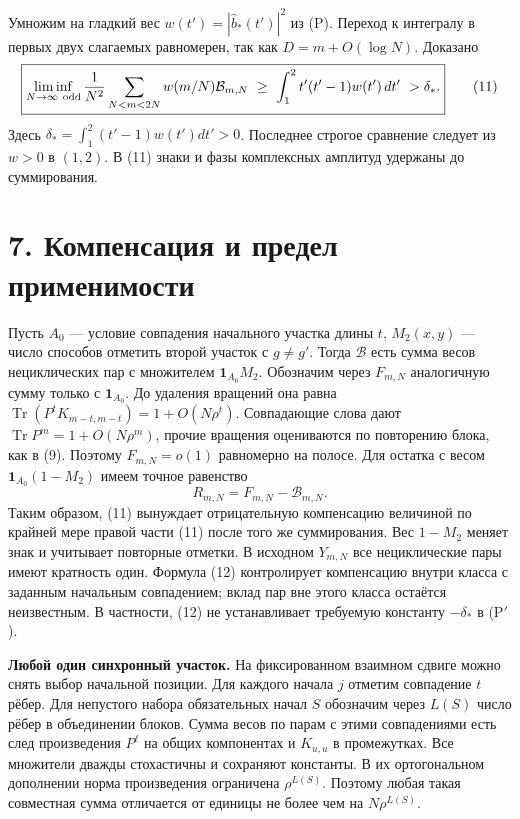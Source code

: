 \documentclass[11pt,a4paper]{article}
\newcommand{\Tr}{\operatorname{Tr}}
\newcommand{\sect}[1]{\section*{\sffamily\color{ink}#1}}
\newcommand{\subt}[1]{\par\medskip\noindent\textbf{#1.}\quad}
\begin{document}
Умножим на гладкий вес $w(t')=|\widehat b_*(t')|^2$ из (P). Переход к интегралу в первых двух слагаемых равномерен, так как $D=m+O(\log N)$. Доказано
\[
 \boxed{\liminf_{N\to\infty\ {\rm odd}}\frac1{N^2}
 \sum_{N<m<2N}w(m/N)\mathcal B_{m,N}
 \ \ge\ \int_1^2 t'(t'-1)w(t')\,dt'\ >\delta_* .}                     \tag{11}
\]
Здесь $\delta_*=\int_1^2(t'-1)w(t')dt'>0$. Последнее строгое сравнение следует из $w>0$ в $(1,2)$. В (11) знаки и фазы комплексных амплитуд удержаны до суммирования.
\newpage
\sect{7. Компенсация и предел применимости}
Пусть $A_0$ --- условие совпадения начального участка длины $t$, $M_2(x,y)$ --- число способов отметить второй участок с $g\ne g'$. Тогда $\mathcal B$ есть сумма весов нециклических пар с множителем $\mathbf1_{A_0}M_2$. Обозначим через $F_{m,N}$ аналогичную сумму только с $\mathbf1_{A_0}$. До удаления вращений она равна $\Tr(P^t K_{m-t,m-t})=1+O(N\rho^t)$. Совпадающие слова дают $\Tr P^m=1+O(N\rho^m)$, прочие вращения оцениваются по повторению блока, как в (9). Поэтому $F_{m,N}=o(1)$ равномерно на полосе. Для остатка с весом $\mathbf1_{A_0}(1-M_2)$ имеем точное равенство
\[
 R_{m,N}=F_{m,N}-\mathcal B_{m,N}.                                       \tag{12}
\]
Таким образом, (11) вынуждает отрицательную компенсацию величиной по крайней мере правой части (11) после того же суммирования. Вес $1-M_2$ меняет знак и учитывает повторные отметки. В исходном $Y_{m,N}$ все нециклические пары имеют кратность один. Формула (12) контролирует компенсацию внутри класса с заданным начальным совпадением; вклад пар вне этого класса остаётся неизвестным. В частности, (12) не устанавливает требуемую константу $-\delta_*$ в (P$'$).

\subt{Любой один синхронный участок} На фиксированном взаимном сдвиге можно снять выбор начальной позиции. Для каждого начала $j$ отметим совпадение $t$ рёбер. Для непустого набора обязательных начал $S$ обозначим через $L(S)$ число рёбер в объединении блоков. Сумма весов по парам с этими совпадениями есть след произведения $P^{\ell}$ на общих компонентах и $K_{u,u}$ в промежутках. Все множители дважды стохастичны и сохраняют константы. В их ортогональном дополнении норма произведения ограничена $\rho^{L(S)}$. Поэтому любая такая совместная сумма отличается от единицы не более чем на $N\rho^{L(S)}$.
\end{document}
